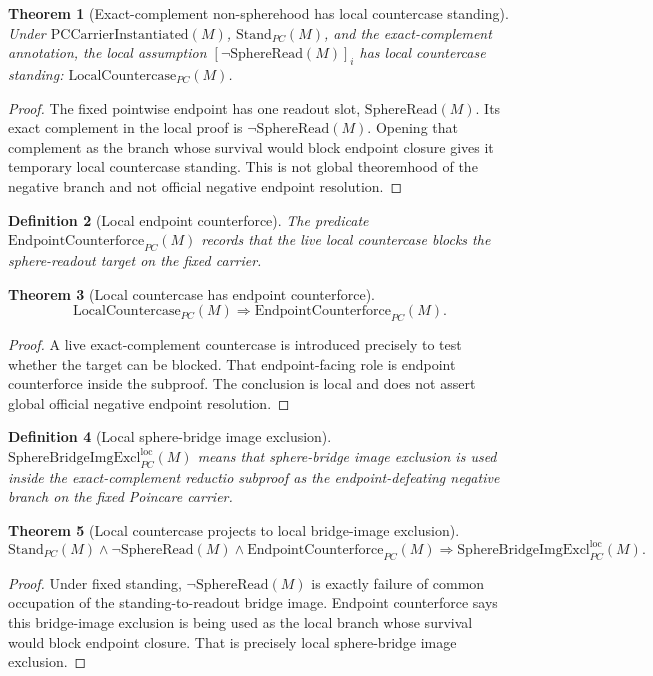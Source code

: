 \documentclass[11pt]{article}
\newtheorem{theorem}{Theorem}[section]
\newtheorem{definition}[theorem]{Definition}
\newcommand{\StandPC}{\mathrm{Stand}_{PC}}
\newcommand{\SphereRead}{\mathrm{SphereRead}}
\newcommand{\PCCarrierInst}{\mathrm{PCCarrierInstantiated}}
\newcommand{\SphereBridgeImgExclLoc}{\mathrm{SphereBridgeImgExcl}^{\mathrm{loc}}_{PC}}
\newcommand{\LocalCountercasePC}{\mathrm{LocalCountercase}_{PC}}
\newcommand{\EndpointCounterforcePC}{\mathrm{EndpointCounterforce}_{PC}}
\begin{document}
\begin{theorem}[Exact-complement non-spherehood has local countercase standing]\label{thm:local-countercase-standing}
Under \(\PCCarrierInst(M)\), \(\StandPC(M)\), and the exact-complement annotation, the local assumption \([\neg\SphereRead(M)]_i\) has local countercase standing: \(\LocalCountercasePC(M)\).
\end{theorem}
\begin{proof}
The fixed pointwise endpoint has one readout slot, \(\SphereRead(M)\). Its exact complement in the local proof is \(\neg\SphereRead(M)\). Opening that complement as the branch whose survival would block endpoint closure gives it temporary local countercase standing. This is not global theoremhood of the negative branch and not official negative endpoint resolution.
\end{proof}

\begin{definition}[Local endpoint counterforce]
The predicate \(\EndpointCounterforcePC(M)\) records that the live local countercase blocks the sphere-readout target on the fixed carrier.
\end{definition}

\begin{theorem}[Local countercase has endpoint counterforce]\label{thm:local-counterforce}
\[
\LocalCountercasePC(M)\Rightarrow \EndpointCounterforcePC(M).
\]
\end{theorem}
\begin{proof}
A live exact-complement countercase is introduced precisely to test whether the target can be blocked. That endpoint-facing role is endpoint counterforce inside the subproof. The conclusion is local and does not assert global official negative endpoint resolution.
\end{proof}

\begin{definition}[Local sphere-bridge image exclusion]
\(\SphereBridgeImgExclLoc(M)\) means that sphere-bridge image exclusion is used inside the exact-complement reductio subproof as the endpoint-defeating negative branch on the fixed Poincare carrier.
\end{definition}

\begin{theorem}[Local countercase projects to local bridge-image exclusion]\label{thm:local-countercase-bridge-exclusion}
\[
\StandPC(M)\wedge \neg\SphereRead(M)\wedge \EndpointCounterforcePC(M)
\Rightarrow \SphereBridgeImgExclLoc(M).
\]
\end{theorem}
\begin{proof}
Under fixed standing, \(\neg\SphereRead(M)\) is exactly failure of common occupation of the standing-to-readout bridge image. Endpoint counterforce says this bridge-image exclusion is being used as the local branch whose survival would block endpoint closure. That is precisely local sphere-bridge image exclusion.
\end{proof}
\end{document}
